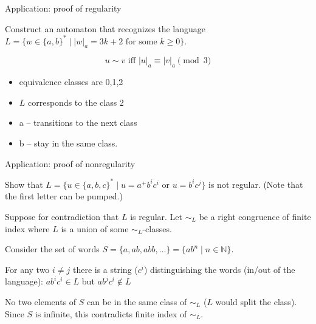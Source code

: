 \documentclass[handout]{beamer}
\begin{document}
\begin{frame}{Application: proof of regularity}

    \begin{example}
        Construct an automaton that recognizes the language $L=\{w\in\{a,b\}^* \mid  |w|_{a}=3k+2\text{ for some }k\geq 0\}$.
    \end{example}    
    \vspace{-12pt}
    $$
    u\sim v \text{ iff } |u|_a \equiv |v|_a \pmod{3}
    $$
    \vspace{-16pt}
    \begin{itemize}
        \item equivalence classes are 0,1,2
        \item $L$ corresponds to the class 2
        \item a -- transitions to the next class
        \item b -- stay in the same class.
    \end{itemize}
    
    \begin{center}
    \end{center}        

\end{frame}


\begin{frame}{Application: proof of nonregularity}

    \begin{example}
        Show that $L=\{u\in\{a,b,c\}^*\mid u=a^+b^ic^i \text{ or } u=b^ic^j\}$ is not regular. (Note that the first letter can be pumped.)
    \end{example}

    Suppose for contradiction that $L$ is regular. Let $\sim_{L}$ be a right congruence of finite index where $L$ is a union of some $\sim_{L}$-classes.
        
    Consider the set of words $S=\{a,ab,abb,\ldots\}=\{ab^n\mid n\in\mathbb N\}$.
    
    For any two $i\neq j$ there is a string ($c^i$) distinguishing the words (in/out of the language): $ab^ic^i\in L$ but $ab^jc^i\notin L$
    
    No two elements of $S$ can be in the same class of  $\sim_{L}$ ($L$ would split the class). Since $S$ is infinite, this contradicts finite index of $\sim_{L}$.\hfill\qedsymbol

\end{frame}
\end{document}
